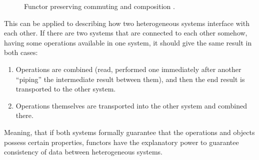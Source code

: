 \documentclass{article}
\begin{document}
\begin{figure}[h]
    \begin{center}
    \end{center}
    \caption{Functor preserving commuting and composition \cite{Ahrens}.}
    \label{funct}
\end{figure}

This can be applied to describing how two heterogeneous systems interface with each other.
If there are two systems that are connected to each other somehow, having some operations
available in one system, it should give the same result in both cases:
\begin{enumerate}[*]
    \item Operations are combined (read, performed one immediately after another “piping” the
    intermediate result between them), and then the end result is transported to the other
    system.
    \item Operations themselves are transported into the other system and combined there.
\end{enumerate}
Meaning, that if both systems formally guarantee that the operations and objects possess
certain properties, functors have the explanatory power to guarantee consistency of data between
heterogeneous systems.
\end{document}
